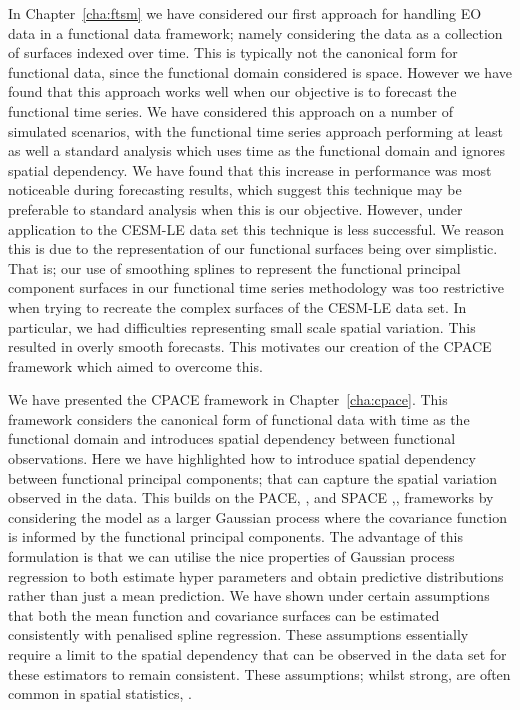 In Chapter~\ref{cha:ftsm} we have considered our first approach for handling EO data in a functional data framework; namely considering the data as a collection of surfaces indexed over time.
This is typically not the canonical form for functional data, since the functional domain considered is space.
However we have found that this approach works well when our objective is to forecast the functional time series.
We have considered this approach on a number of simulated scenarios, with the functional time series approach performing at least as well a standard analysis which uses time as the functional domain and ignores spatial dependency.
We have found that this increase in performance was most noticeable during forecasting results, which suggest this technique may be preferable to standard analysis when this is our objective.
However, under application to the CESM-LE data set this technique is less successful.
We reason this is due to the representation of our functional surfaces being over simplistic.
That is; our use of smoothing splines to represent the functional principal component surfaces in our functional time series methodology was too restrictive when trying to recreate the complex surfaces of the CESM-LE data set.
In particular, we had difficulties representing small scale spatial variation.
This resulted in overly smooth forecasts.
This motivates our creation of the CPACE framework which aimed to overcome this.

We have presented the CPACE framework in Chapter~\ref{cha:cpace}. 
This framework considers the canonical form of functional data with time as the functional domain and introduces spatial dependency between functional observations.
Here we have highlighted how to introduce spatial dependency between functional principal components; that can capture the spatial variation observed in the data.
This builds on the PACE, \citep{yao_functional_2005}, and SPACE ,\citep{liu_functional_2017}, frameworks by considering the model as a larger Gaussian process where the covariance function is informed by the functional principal components.
The advantage of this formulation is that we can utilise the nice properties of Gaussian process regression to both estimate hyper parameters and obtain predictive distributions rather than just a mean prediction. 
We have shown under certain assumptions that both the mean function and covariance surfaces can be estimated consistently with penalised spline regression.
These assumptions essentially require a limit to the spatial dependency that can be observed in the data set for these estimators to remain consistent.
These assumptions; whilst strong, are often common in spatial statistics, \citep{cressie_statistics_2015}.

